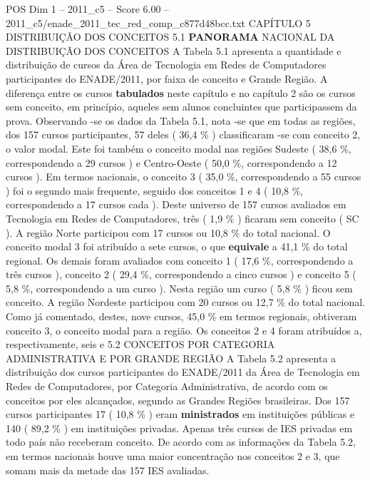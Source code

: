 \begin{textsample}{POS Dim 1 – 2011\_c5 – Score 6.00 – 2011\_c5/enade\_2011\_tec\_red\_comp\_c877d48bcc.txt}  \label{ex:f1_pos_128}
CAPÍTULO 5 DISTRIBUIÇÃO DOS CONCEITOS 5.1 \textbf{PANORAMA} NACIONAL DA DISTRIBUIÇÃO DOS CONCEITOS A Tabela 5.1 apresenta a quantidade e distribuição de cursos da Área de Tecnologia em Redes de Computadores participantes do ENADE/2011, por faixa de conceito e Grande Região.
A diferença entre os cursos \textbf{tabulados} neste capítulo e no capítulo 2 são os cursos sem conceito, em princípio, aqueles sem alunos concluintes que participassem da prova.
Observando -se os dados da Tabela 5.1, nota -se que em todas as regiões, dos 157 cursos participantes, 57 deles ( 36,4 \% ) classificaram -se com conceito 2, o valor modal.
Este foi também o conceito modal nas regiões Sudeste ( 38,6 \%, correspondendo a 29 cursos ) e Centro-Oeste ( 50,0 \%, correspondendo a 12 cursos ).
Em termos nacionais, o conceito 3 ( 35,0 \%, correspondendo a 55 cursos ) foi o segundo mais frequente, seguido dos conceitos 1 e 4 ( 10,8 \%, correspondendo a 17 cursos cada ).
Deste universo de 157 cursos avaliados em Tecnologia em Redes de Computadores, três ( 1,9 \% ) ficaram sem conceito ( SC ).
A região Norte participou com 17 cursos ou 10,8 \% do total nacional.
O conceito modal 3 foi atribuído a sete cursos, o que \textbf{equivale} a 41,1 \% do total regional.
Os demais foram avaliados com conceito 1 ( 17,6 \%, correspondendo a três cursos ), conceito 2 ( 29,4 \%, correspondendo a cinco cursos ) e conceito 5 ( 5,8 \%, correspondendo a um curso ).
Nesta região um curso ( 5,8 \% ) ficou sem conceito.
A região Nordeste participou com 20 cursos ou 12,7 \% do total nacional.
Como já comentado, destes, nove cursos, 45,0 \% em termos regionais, obtiveram conceito 3, o conceito modal para a região.
Os conceitos 2 e 4 foram atribuídos a, respectivamente, seis e 5.2 CONCEITOS POR CATEGORIA ADMINISTRATIVA E POR GRANDE REGIÃO A Tabela 5.2 apresenta a distribuição dos cursos participantes do ENADE/2011 da Área de Tecnologia em Redes de Computadores, por Categoria Administrativa, de acordo com os conceitos por eles alcançados, segundo as Grandes Regiões brasileiras.
Dos 157 cursos participantes 17 ( 10,8 \% ) eram \textbf{ministrados} em instituições públicas e 140 ( 89,2 \% ) em instituições privadas.
Apenas três cursos de IES privadas em todo país não receberam conceito.
De acordo com as informações da Tabela 5.2, em termos nacionais houve uma maior concentração nos conceitos 2 e 3, que somam mais da metade das 157 IES avaliadas.

\end{textsample}
